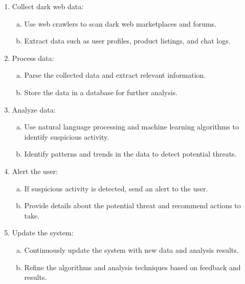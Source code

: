 \documentclass[10pt]{report}
\begin{document}
\begin{enumerate}
    \item Collect dark web data:
    \begin{enumerate}[a)]
        \item Use web crawlers to scan dark web marketplaces and forums.
        \item Extract data such as user profiles, product listings, and chat logs.
    \end{enumerate}
    \item Process data:
    \begin{enumerate}[a)]
        \item Parse the collected data and extract relevant information.
        \item Store the data in a database for further analysis.
    \end{enumerate}
    \item Analyze data:
    \begin{enumerate}[a)]
        \item  Use natural language processing and machine learning algorithms to identify suspicious activity.
        \item Identify patterns and trends in the data to detect potential threats.
    \end{enumerate}
    \item Alert the user:
    \begin{enumerate}[a)]
        \item If suspicious activity is detected, send an alert to the user.
        \item Provide details about the potential threat and recommend actions to take.
    \end{enumerate}
    \item Update the system:
    \begin{enumerate}[a)]
        \item Continuously update the system with new data and analysis results.
        \item Refine the algorithms and analysis techniques based on feedback and results.
    \end{enumerate}
\end{enumerate}
\end{document}

